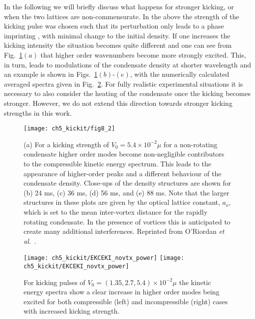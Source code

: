     In the following we will briefly discuss what happens for stronger kicking, or when the two lattices are non-commensurate. In the above the strength of the kicking pulse was chosen such that its perturbation only leads to a phase imprinting \cite{Vtx:Dobrek_pra_1999,BEC:Denschlag_science_2000}, with minimal change to the initial density. If one increases the kicking intensity the situation becomes quite different and one can see from Fig.~\ref{fig:kickp20k}$(a)$ that higher order wavenumbers become more strongly excited. This, in turn, leads to modulations of the condensate density at shorter wavelength and an example is shown in Figs.~\ref{fig:kickp20k}$(b)$-$(e)$, with the numerically calculated averaged spectra given in Fig.~\ref{fig:kick_compare_spec}. For fully realistic experimental situations it is necessary to also consider the heating of the condensate once the kicking becomes stronger. However, we do not extend this direction towards stronger kicking strengths in this work.

\begin{figure}
    \centering
	\texttt{[image: ch5\_kickit/fig8\_2]}
	\caption[Higher order modes induced by stronger kicking.]{(a) For a kicking strength of $V_0 = 5.4\times10^{-2}\mu$ for a non-rotating condensate higher order modes become non-negligible contributors to the compressible kinetic energy spectrum. This leads to the appearance of higher-order peaks and a different behaviour of the condensate density. Close-ups of the density structures are shown for (b) 24 ms, (c) 36 ms, (d) 56 ms, and (e) 88 ms. Note that the larger structures in these plots are given by the optical lattice constant, $a_o$, which is set to the mean inter-vortex distance for the rapidly rotating condensate. In the presence of vortices this is anticipated to create many additional interferences. Reprinted from O'Riordan {\textit{et al}.}~\cite{VTX:oriordan_pra_2016}.}
	\label{fig:kickp20k}
\end{figure}
\begin{figure}
    \centering
    \texttt{[image: ch5\_kickit/EKCEKI\_novtx\_power]}
    \texttt{[image: ch5\_kickit/EKCEKI\_novtx\_power]}
	\caption[Comparison of kinetic energy spectra for increased kicking strengths.]{For kicking pulses of $V_0 = (1.35,2.7,5.4)\times 10^{-2} \mu$ the kinetic energy spectra show a clear increase in higher order modes being excited for both compressible (left) and incompressible (right) cases with increased kicking strength.}\label{fig:kick_compare_spec}
\end{figure}

